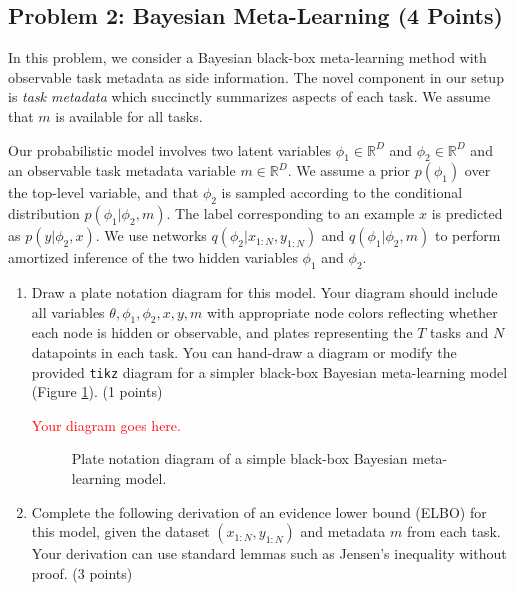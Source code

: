 \documentclass[12pt]{article}
\begin{document}
\subsection*{Problem 2: Bayesian Meta-Learning (4 Points)}
In this problem, we consider a Bayesian black-box meta-learning method with observable task metadata as side information.
The novel component in our setup is \textit{task metadata} which succinctly summarizes aspects of each task.
We assume that $m$ is available for all tasks.

Our probabilistic model involves two latent variables $\phi_1 \in \mathbb{R}^D$ and $\phi_2 \in \mathbb{R}^D$ and an observable task metadata variable $m \in \mathbb{R}^D$.
We assume a prior $p(\phi_1)$ over the top-level variable, and that $\phi_2$ is sampled according to the conditional distribution $p(\phi_1 | \phi_2, m)$.
The label corresponding to an example $x$ is predicted as $p(y | \phi_2, x)$.
We use networks $q(\phi_2 | x_{1:N}, y_{1:N})$ and $q(\phi_1 | \phi_2, m)$ to perform amortized inference of the two hidden variables $\phi_1$ and $\phi_2$.

\begin{enumerate}[label=(\alph*)]
\item 
Draw a plate notation diagram for this model.
Your diagram should include all variables $\theta, \phi_1, \phi_2, x, y, m$ with appropriate node colors reflecting whether each node is hidden or observable, and plates representing the $T$ tasks and $N$ datapoints in each task.
You can hand-draw a diagram or modify the provided \texttt{tikz} diagram for a simpler black-box Bayesian meta-learning model (Figure \ref{fig:plate_np}).
(1 points)

\textcolor{red}{
Your diagram goes here.
}


\begin{figure} \centering
{}
\caption{ \label{fig:plate_np}
Plate notation diagram of a simple black-box Bayesian meta-learning model.}
\end{figure}

\item 
Complete the following derivation of an evidence lower bound (ELBO) for this model, given the dataset $(x_{1:N}, y_{1:N})$ and metadata $m$ from each task.
Your derivation can use standard lemmas such as Jensen's inequality without proof.
(3 points)
\end{enumerate}
\end{document}
